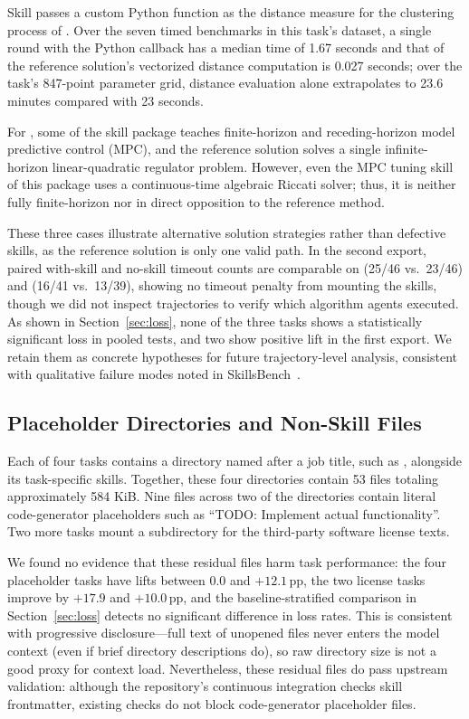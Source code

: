 \documentclass[10pt,conference]{IEEEtran}
\newif\ifkeepcuts \keepcutstrue
\newcommand{\cut}[1]{\ifkeepcuts #1\fi}
\begin{document}
Skill passes a custom Python function as the distance measure for the clustering process of . Over the seven timed benchmarks in this task's dataset, a single round with the Python callback has a median time of 1.67 seconds and that of the reference solution's vectorized distance computation is 0.027 seconds; over the task's 847-point parameter grid, distance evaluation alone extrapolates to 23.6 minutes compared with 23 seconds.

For , some of the skill package teaches finite-horizon and receding-horizon model predictive control (MPC), and the reference solution solves a single infinite-horizon linear-quadratic regulator problem. However, even the MPC tuning skill of this package uses a continuous-time algebraic Riccati solver; thus, it is neither fully finite-horizon nor in direct opposition to the reference method.

These three cases illustrate alternative solution strategies rather than defective skills, as the reference solution is only one valid path. In the second export, paired with-skill and no-skill timeout counts are comparable on  (25/46 vs.\ 23/46) and  (16/41 vs.\ 13/39), showing no timeout penalty from mounting the skills, though we did not inspect trajectories to verify which algorithm agents executed. As shown in Section~\ref{sec:loss}, none of the three tasks shows a statistically significant loss in pooled tests, and two show positive lift in the first export.\cut{ We retain them as concrete hypotheses for future trajectory-level analysis, consistent with qualitative failure modes noted in SkillsBench~\cite{li2026skillsbench}.}

\subsection{Placeholder Directories and Non-Skill Files}
Each of four tasks contains a directory named after a job title, such as , alongside its task-specific skills. Together, these four directories contain 53 files totaling approximately 584 KiB. Nine files across two of the directories contain literal code-generator placeholders such as ``TODO: Implement actual functionality''. Two more tasks mount a  subdirectory for the third-party software license texts.

We found no evidence that these residual files harm task performance: the four placeholder tasks have lifts between $0.0$ and $+12.1$\,pp, the two license tasks improve by $+17.9$ and $+10.0$\,pp, and the baseline-stratified comparison in Section~\ref{sec:loss} detects no significant difference in loss rates. This is consistent with progressive disclosure---full text of unopened files never enters the model context (even if brief directory descriptions do), so raw directory size is not a good proxy for context load. Nevertheless, these residual files do pass upstream validation: although the repository's continuous integration checks skill frontmatter, existing checks do not block code-generator placeholder files.
\end{document}
